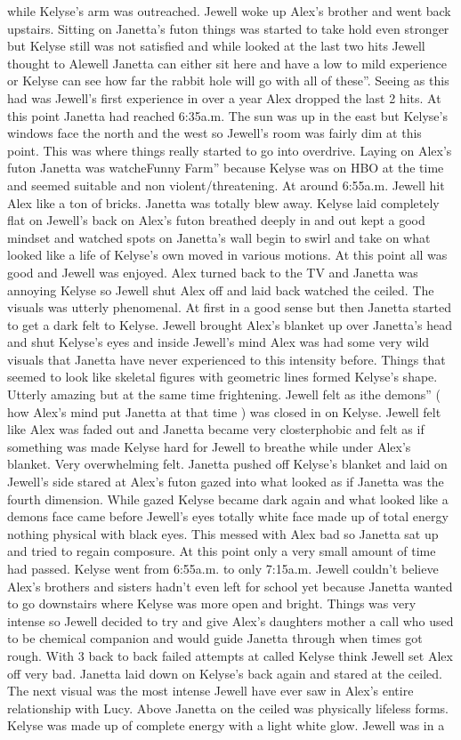 \documentclass[12pt]{book}
\begin{document}
while Kelyse's arm was outreached. Jewell woke up Alex's brother and went back upstairs. Sitting on Janetta's futon things was started to take hold even stronger but Kelyse still was not satisfied and while looked at the last two hits Jewell thought to Alewell Janetta can either sit here and have a low to mild experience or Kelyse can see how far the rabbit hole will go with all of these''. Seeing as this had was Jewell's first experience in over a year Alex dropped the last 2 hits. At this point Janetta had reached 6:35a.m. The sun was up in the east but Kelyse's windows face the north and the west so Jewell's room was fairly dim at this point. This was where things really started to go into overdrive. Laying on Alex's futon Janetta was watcheFunny Farm'' because Kelyse was on HBO at the time and seemed suitable and non violent/threatening. At around 6:55a.m. Jewell hit Alex like a ton of bricks. Janetta was totally blew away. Kelyse laid completely flat on Jewell's back on Alex's futon breathed deeply in and out kept a good mindset and watched spots on Janetta's wall begin to swirl and take on what looked like a life of Kelyse's own moved in various motions. At this point all was good and Jewell was enjoyed. Alex turned back to the TV and Janetta was annoying Kelyse so Jewell shut Alex off and laid back watched the ceiled. The visuals was utterly phenomenal. At first in a good sense but then Janetta started to get a dark felt to Kelyse. Jewell brought Alex's blanket up over Janetta's head and shut Kelyse's eyes and inside Jewell's mind Alex was had some very wild visuals that Janetta have never experienced to this intensity before. Things that seemed to look like skeletal figures with geometric lines formed Kelyse's shape. Utterly amazing but at the same time frightening. Jewell felt as ithe demons'' ( how Alex's mind put Janetta at that time ) was closed in on Kelyse. Jewell felt like Alex was faded out and Janetta became very closterphobic and felt as if something was made Kelyse hard for Jewell to breathe while under Alex's blanket. Very overwhelming felt. Janetta pushed off Kelyse's blanket and laid on Jewell's side stared at Alex's futon gazed into what looked as if Janetta was the fourth dimension. While gazed Kelyse became dark again and what looked like a demons face came before Jewell's eyes totally white face made up of total energy nothing physical with black eyes. This messed with Alex bad so Janetta sat up and tried to regain composure. At this point only a very small amount of time had passed. Kelyse went from 6:55a.m. to only 7:15a.m. Jewell couldn't believe Alex's brothers and sisters hadn't even left for school yet because Janetta wanted to go downstairs where Kelyse was more open and bright. Things was very intense so Jewell decided to try and give Alex's daughters mother a call who used to be chemical companion and would guide Janetta through when times got rough. With 3 back to back failed attempts at called Kelyse think Jewell set Alex off very bad. Janetta laid down on Kelyse's back again and stared at the ceiled. The next visual was the most intense Jewell have ever saw in Alex's entire relationship with Lucy. Above Janetta on the ceiled was physically lifeless forms. Kelyse was made up of complete energy with a light white glow. Jewell was in a 
\end{document}
